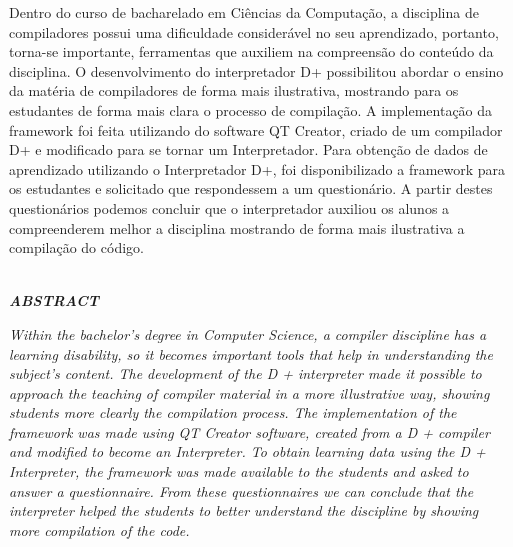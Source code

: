\documentclass[12pt,oneside,a4paper,chapter=TITLE,section=TITLE,sumario=tradicional]{abntex2}
\begin{document}

\imprimircapa
\imprimirfolhaderosto


\begin{resumo}
	Dentro do curso de bacharelado em Ciências da Computação, a disciplina de compiladores possui uma dificuldade considerável no seu aprendizado, portanto, torna-se importante, ferramentas que auxiliem na compreensão do conteúdo da disciplina. O desenvolvimento do interpretador D+ possibilitou abordar o ensino da matéria de compiladores de forma mais ilustrativa, mostrando para os estudantes de forma mais clara o processo de compilação. A implementação da framework foi feita utilizando do software QT Creator, criado de um compilador D+ e modificado para se tornar um Interpretador. Para obtenção de dados de aprendizado utilizando o Interpretador D+, foi disponibilizado a framework para os estudantes e solicitado que respondessem a um questionário. A partir destes questionários podemos concluir que o interpretador auxiliou os alunos a compreenderem melhor a disciplina  mostrando de forma mais ilustrativa a compilação do código.
    

\begin{center}
\textbf{\textit{\\ABSTRACT}}
\end{center}
\textit{Within the bachelor's degree in Computer Science, a compiler discipline has a learning disability, so it becomes important tools that help in understanding the subject's content. The development of the D + interpreter made it possible to approach the teaching of compiler material in a more illustrative way, showing students more clearly the compilation process. The implementation of the framework was made using QT Creator software, created from a D + compiler and modified to become an Interpreter. To obtain learning data using the D + Interpreter, the framework was made available to the students and asked to answer a questionnaire. From these questionnaires we can conclude that the interpreter helped the students to better understand the discipline by showing more compilation of the code.
}



\end{resumo}
\end{document}
